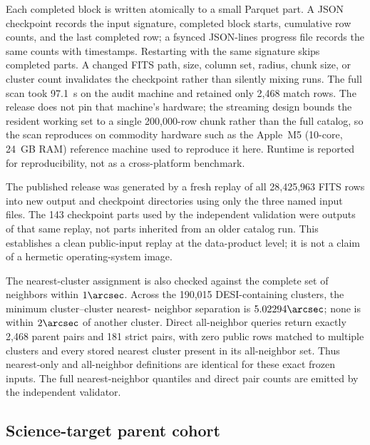 \documentclass[twocolumn,linenumbers]{aastex702}
\begin{document}
Each completed block is written atomically to a small Parquet part.  A JSON checkpoint records
the input signature, completed block starts, cumulative row counts, and the last completed row;
a fsynced JSON-lines progress file records the same counts with timestamps.  Restarting with the
same signature skips completed parts.  A changed FITS path, size, column set, radius, chunk size,
or cluster count invalidates the checkpoint rather than silently mixing runs.  The full scan took
97.1~s on the audit machine and retained only 2,468 match rows.  The release does not pin that
machine's hardware; the streaming design bounds the resident working set to a single 200,000-row
chunk rather than the full catalog, so the scan reproduces on commodity hardware such as the
Apple~M5 (10-core, 24~GB RAM) reference machine used to reproduce it here.  Runtime is reported for
reproducibility, not as a cross-platform benchmark.

The published release was generated by a fresh replay of all 28,425,963 FITS rows into new output
and checkpoint directories using only the three named input files.  The 143 checkpoint parts used
by the independent validation were outputs of that same replay, not parts inherited from an older
catalog run.  This establishes a clean public-input replay at the data-product level; it is not a
claim of a hermetic operating-system image.

The nearest-cluster assignment is also checked against the complete set of neighbors within
$1\arcsec$.  Across the 190,015 DESI-containing clusters, the minimum cluster--cluster nearest-
neighbor separation is $5.02294\arcsec$; none is within $2\arcsec$ of another cluster.  Direct
all-neighbor queries return exactly 2,468 parent pairs and 181 strict pairs, with zero public rows
matched to multiple clusters and every stored nearest cluster present in its all-neighbor set.
Thus nearest-only and all-neighbor definitions are identical for these exact frozen inputs.  The
full nearest-neighbor quantiles and direct pair counts are emitted by the independent validator.

\subsection{Science-target parent cohort}\label{sec:parent-selection}
\end{document}
